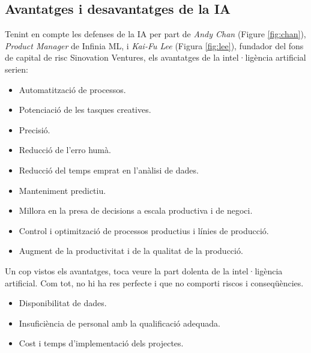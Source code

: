 \documentclass[a4paper,12pt]{article}
\begin{document}
\subsection*{Avantatges i desavantatges de la IA}
Tenint en compte les defenses de la IA per part de \textit{Andy Chan} (Figure \ref{fig:chan}), \textit{Product Manager} de Infinia ML, i \textit{Kai-Fu Lee} (Figura \ref{fig:lee}), fundador del fons de capital de risc Sinovation Ventures, els avantatges de la intel·ligència artificial serien:
\begin{itemize}
    \item Automatització de processos.
    \item Potenciació de les tasques creatives.
    \item Precisió.
    \item Reducció de l'erro humà.
    \item Reducció del temps emprat en l'anàlisi de dades.
    \item Manteniment predictiu.
    \item Millora en la presa de decisions a escala productiva i de negoci.
    \item Control i optimització de processos productius i línies de producció.
    \item Augment de la productivitat i de la qualitat de la producció.
\end{itemize}
Un cop vistos els avantatges, toca veure la part dolenta de la intel·ligència artificial. Com tot, no hi ha res perfecte i que no comporti riscos i conseqüències.
\begin{itemize}
    \item Disponibilitat de dades.
    \item Insuficiència de personal amb la qualificació adequada.
    \item Cost i temps d'implementació dels projectes.
\end{itemize}
\end{document}
